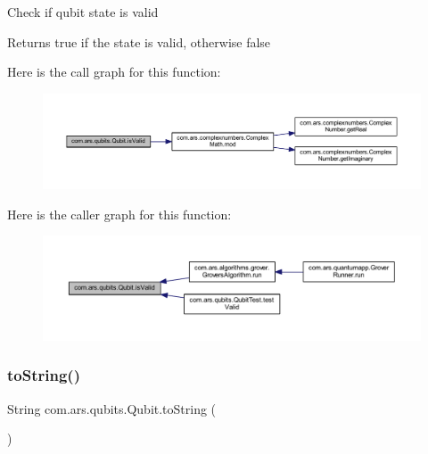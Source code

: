 Check if qubit state is valid \begin{DoxyReturn}{Returns}
true if the state is valid, otherwise false 
\end{DoxyReturn}
Here is the call graph for this function\+:
\nopagebreak
\begin{figure}[H]
\begin{center}
\leavevmode
\includegraphics[width=350pt]{classcom_1_1ars_1_1qubits_1_1_qubit_acd0c96f4ba85205af1647a7f0e2c404a_cgraph}
\end{center}
\end{figure}
Here is the caller graph for this function\+:
\nopagebreak
\begin{figure}[H]
\begin{center}
\leavevmode
\includegraphics[width=350pt]{classcom_1_1ars_1_1qubits_1_1_qubit_acd0c96f4ba85205af1647a7f0e2c404a_icgraph}
\end{center}
\end{figure}
\hypertarget{classcom_1_1ars_1_1qubits_1_1_qubit_abd0f4fc61885920dd3c7dde9c968a543}{}\label{classcom_1_1ars_1_1qubits_1_1_qubit_abd0f4fc61885920dd3c7dde9c968a543} 
\subsubsection{\texorpdfstring{to\+String()}{toString()}}
{\footnotesize\ttfamily String com.\+ars.\+qubits.\+Qubit.\+to\+String (\begin{DoxyParamCaption}{ }\end{DoxyParamCaption})}

